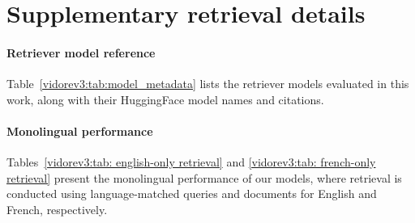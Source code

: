 \section{Supplementary retrieval details}
\label{vidorev3:appendix:supp retrieval}
\paragraph{Retriever model reference}

Table~\ref{vidorev3:tab:model_metadata} lists the retriever models evaluated in this work, along with their HuggingFace model names and citations.


\paragraph{Monolingual performance} \label{vidorev3:sec:english retrievers}

Tables~\ref{vidorev3:tab: english-only retrieval} and \ref{vidorev3:tab: french-only retrieval} present the monolingual performance of our models, where retrieval is conducted using language-matched queries and documents for English and French, respectively.

